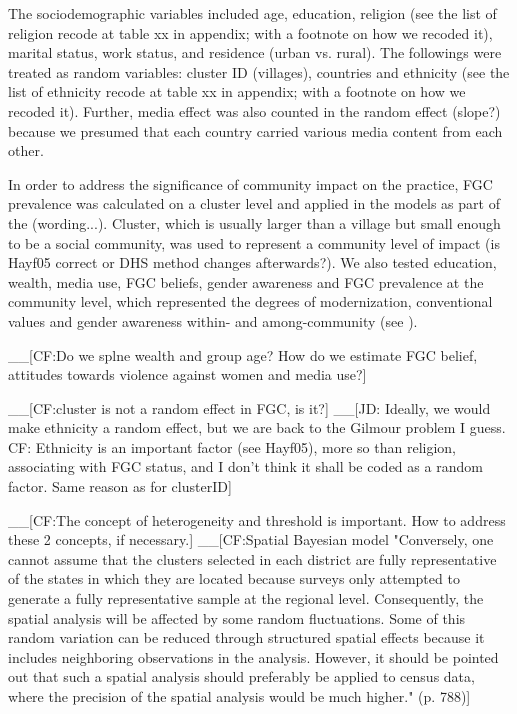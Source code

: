 \documentclass[12pt,]{article}
\begin{document}
The sociodemographic variables included age, education, religion (see the list of religion recode at table xx in appendix; with a footnote on how we recoded it), marital status, work status, and residence (urban vs. rural).  The followings were treated as random variables:  cluster ID (villages), countries and ethnicity (see the list of ethnicity recode at table xx in appendix; with a footnote on how we recoded it).  Further, media effect was also counted in the random effect (slope?) because we presumed that each country carried various media content from each other.

In order to address the significance of community impact on the practice, FGC prevalence was calculated on a cluster level  and applied in the models as part of the (wording...). Cluster, which is usually larger than a village but small enough to be a social community, was used to represent a community level of impact \cite{Hayf05} (is Hayf05 correct or DHS method changes afterwards?).  We also tested education, wealth, media use, FGC beliefs, gender awareness and FGC prevalence at the community level, which represented the degrees of modernization, conventional values and gender awareness within- and among-community (see \cite{Achi14, BoylMcMo02, Hayf05, KandNwak09, ModrLiu13, OdukAfol17}).

 \_\_{[}CF:Do we splne wealth and group age? How do we estimate FGC belief, attitudes towards violence against women and media use?{]}


\_\_{[}CF:cluster is not a random effect in FGC, is it?{]}
\_\_{[}JD: Ideally, we would make ethnicity a random effect, but we are back to the Gilmour problem I guess. CF: Ethnicity is an important factor (see Hayf05), more so than religion, associating with FGC status, and I don't think it shall be coded as a random factor.  Same reason as for clusterID{]}

\_\_{[}CF:The concept of heterogeneity and threshold is important.  How to address these 2 concepts, if necessary.{]}
\_\_{[}CF:Spatial Bayesian model \cite{KandNwak09} "Conversely, one cannot assume that the clusters selected in each district are fully representative of the states in which they are located because surveys only attempted to generate a fully representative sample at the regional level. Consequently, the spatial analysis will be affected by some random fluctuations.  Some of this random variation can be reduced through structured spatial effects because it includes neighboring observations in the analysis. However, it should be pointed out that such a spatial analysis should preferably be applied to census data, where the precision of the spatial analysis would be much higher." (p. 788){]}
\end{document}
